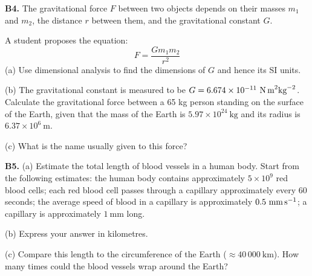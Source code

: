 \begin{exercisebox}[1]
\vspace{0.4cm}

\textbf{B4.} The gravitational force $F$ between two
objects depends on their masses $m_1$ and $m_2$, the
distance $r$ between them, and the gravitational
constant $G$.

A student proposes the equation:
\[
  F = \frac{G m_1 m_2}{r^2}
\]
(a) Use dimensional analysis to find the dimensions of
$G$ and hence its SI units.

(b) The gravitational constant is measured to be
$G = 6.674 \times 10^{-11}\ \text{N\,m}^2\text{kg}^{-2}$.
Calculate the gravitational force between a 65 kg person
standing on the surface of the Earth, given that the mass
of the Earth is $5.97 \times 10^{24}\ \text{kg}$ and its
radius is $6.37 \times 10^6\ \text{m}$.

(c) What is the name usually given to this force?
\hfill{}

\vspace{0.4cm}

\textbf{B5.} (a) Estimate the total length of blood
vessels in a human body.
Start from the following estimates: the human body
contains approximately $5 \times 10^9$ red blood cells;
each red blood cell passes through a capillary
approximately every 60 seconds; the average speed of
blood in a capillary is approximately
$0.5\ \text{mm\,s}^{-1}$; a capillary is approximately
$1\ \text{mm}$ long.

\smallskip

(b) Express your answer in kilometres.

\smallskip

(c) Compare this length to the circumference of the Earth
($\approx 40\,000\ \text{km}$). How many times could
the blood vessels wrap around the Earth?
\hfill{}

\end{exercisebox}

\vspace{0.5cm}

%
%
%
%
%
%
%
%
%
